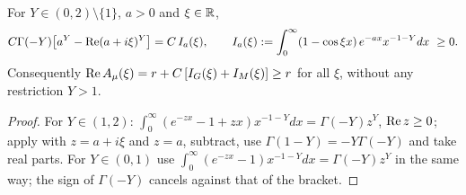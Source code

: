 \begin{lemma}\label{lem:LK}
For $Y\in(0,2)\setminus\{1\}$, $a>0$ and $\xi\in\mathbb{R}$,
\[
 C\Gamma(-Y)\bigl[a^Y-\operatorname{Re}(a+i\xi)^Y\bigr]
 =C\,I_a(\xi),\qquad
 I_a(\xi):=\int_0^\infty(1-\cos\xi x)\,e^{-ax}x^{-1-Y}dx\ \ge0 .
\]
Consequently $\operatorname{Re} A_\mu(\xi)=r+C\,[I_G(\xi)+I_M(\xi)]\ge r$ for all $\xi$,
without any restriction $Y>1$.
\end{lemma}
\begin{proof}
For $Y\in(1,2)$: $\int_0^\infty(e^{-zx}-1+zx)x^{-1-Y}dx=\Gamma(-Y)z^Y$,
$\operatorname{Re} z\ge0$; apply with $z=a+i\xi$ and $z=a$, subtract, use
$\Gamma(1-Y)=-Y\Gamma(-Y)$ and take real parts.  For $Y\in(0,1)$ use
$\int_0^\infty(e^{-zx}-1)x^{-1-Y}dx=\Gamma(-Y)z^Y$ in the same way; the
sign of $\Gamma(-Y)$ cancels against that of the bracket.
\end{proof}
